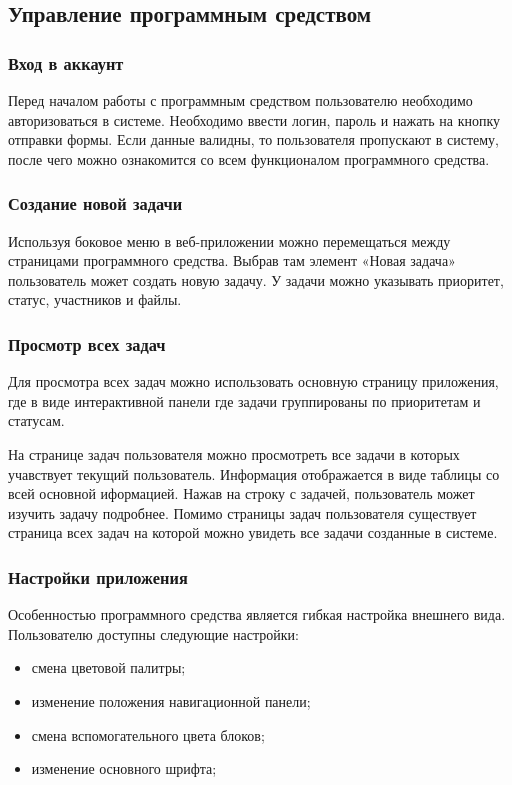 \subsection{Управление программным средством}

\subsubsection{Вход в аккаунт}

Перед началом работы с программным средством пользователю необходимо авторизоваться в системе. Необходимо ввести логин, пароль и нажать
на кнопку отправки формы. Если данные валидны, то пользователя пропускают в систему, после чего можно ознакомится со всем функционалом
программного средства.

\subsubsection{Создание новой задачи}

Используя боковое меню в веб-приложении можно перемещаться между страницами программного средства. Выбрав там элемент «Новая задача»
пользователь может создать новую задачу. У задачи можно указывать приоритет, статус, участников и файлы.

\subsubsection{Просмотр всех задач}

Для просмотра всех задач можно использовать основную страницу приложения, где в виде интерактивной панели где задачи группированы по
приоритетам и статусам. 

На странице задач пользователя можно просмотреть все задачи в которых учавствует текущий пользователь. Информация отображается в виде 
таблицы со всей основной иформацией. Нажав на строку с задачей, пользователь может изучить задачу подробнее. Помимо страницы задач
пользователя существует страница всех задач на которой можно увидеть все задачи созданные в системе.

\subsubsection{Настройки приложения}

Особенностью программного средства является гибкая настройка внешнего вида. Пользователю доступны следующие настройки:
\begin{itemize}
    \item смена цветовой палитры;
    \item изменение положения навигационной панели;
    \item смена вспомогательного цвета блоков;
    \item изменение основного шрифта;
\end{itemize}

